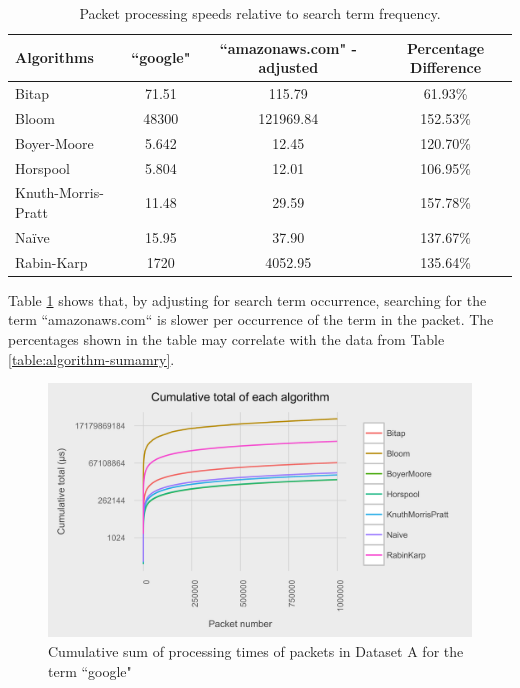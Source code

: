 \documentclass{article}
\begin{document}
\begin{table}[hbt]
  \centering
  \begin{tabular}{l|ccc}
    Algorithms & ``google" & ``amazonaws.com" - adjusted & Percentage Difference\\
    \hline
    Bitap & 71.51 & 115.79 & 61.93\%\\
    Bloom & 48300 & 121969.84 & 152.53\%\\
    Boyer-Moore & 5.642 & 12.45 & 120.70\%\\
    Horspool & 5.804 & 12.01 & 106.95\%\\
    Knuth-Morris-Pratt & 11.48 & 29.59 & 157.78\%\\
    Na{\"i}ve & 15.95 & 37.90 & 137.67\%\\
    Rabin-Karp & 1720 & 4052.95 & 135.64\%
  \end{tabular}
  \caption{Packet processing speeds relative to search term frequency.}
  \label{table:packet-adjusted}
\end{table}

Table \ref{table:packet-adjusted} shows that, by adjusting for search term occurrence, searching for the term ``amazonaws.com`` is slower per occurrence of the term in the packet. The percentages shown in the table may correlate with the data from Table \ref{table:algorithm-sumamry}.


\begin{figure}[h!bt]
  \centering
  \includegraphics[width=\textwidth]{graphs/cum_sum_packets_google.png}
  \caption{Cumulative sum of processing times of packets in Dataset A for the term ``google"}
\end{figure}
\end{document}
